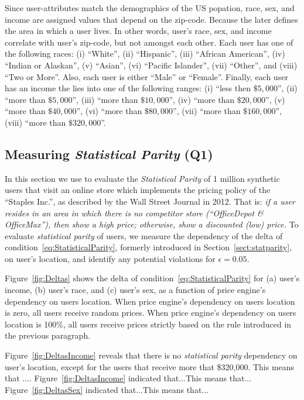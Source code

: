 Since user-attributes match the demographics of the US popation,
race, sex, and income are assigned values that depend on the zip-code. Because
the later defines the area in which a user lives. In other words, user's race,
sex, and income correlate with user's zip-code, but not amongst each other.
Each user has
one of the following races:  (i) ``White'', (ii) ``Hispanic'', (iii) ``African
American'', (iv) ``Indian or Alaskan'', (v) ``Asian'', (vi) ``Pacific
Islander'', (vii) ``Other'', and (viii) ``Two or More''. Also, each user is
either ``Male'' or ``Female''. Finally, each user has an income the lies
into one of the following ranges: (i) ``less then $\$5,000$'', (ii) ``more
than $\$5,000$'', (iii) ``more than $\$10,000$'', (iv) ``more than
$\$20,000$'', (v) ``more than $\$40,000$'', (vi) ``more than $\$80,000$'',
(vii) ``more than $\$160,000$'', (viii) ``more than $\$320,000$''.

\subsection{\normalsize Measuring {\em Statistical Parity} (Q1)}
In this section we use \sysname to evaluate the {\em Statistical Parity}
of 1 million synthetic users that visit an online store which
implements the pricing policy of the ``Staples Inc.'', as described
by the Wall Street Journal in 2012. That is: {\it if a user resides in an
area in which there is no competitor store (``OfficeDepot \& OfficeMax''),
then show a high price; otherwise, show a discounted (low) price.}
To evaluate {\em statistical parity} of users, we measure the dependency of
the delta of condition~\ref{eq:StatisticalParity}, formerly introduced
in Section~\ref{sect:statparity}, on user's location, and identify any
potential violations for $\epsilon=0.05$.

Figure~\ref{fig:Deltas} shows the delta of
condition~\ref{eq:StatisticalParity} for (a) user's income, (b) user's race,
and (c) user's sex, as a function of price engine's dependency on users
location. When price engine's dependency on users location is zero, all
users receive random prices. When price engine's dependency on users location
is 100\%, all users receive prices strictly based on the rule introduced in
the previous paragraph.

Figure~\ref{fig:DeltasIncome} reveals that there is
no {\em statistical parity} dependency on user's location, except for the
users that receive more that \$320,000. This means that ....
Figure~\ref{fig:DeltasIncome} indicated that...This means that...
Figure~\ref{fig:DeltasSex} indicated that...This means that...

